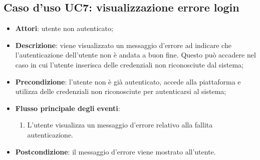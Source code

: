 \subsection{Caso d'uso UC7: visualizzazione errore login}
\begin{itemize}
\item \textbf{Attori}: utente non autenticato;
\item \textbf{Descrizione}: viene visualizzato un messaggio d'errore ad indicare che l'autenticazione dell'utente non è andata a buon fine. Questo può accadere nel caso in cui l'utente inserisca delle credenziali non riconosciute dal sistema; 
      \item \textbf{Precondizione}: l'utente non è già autenticato, accede alla piattaforma e utilizza delle credenziali non riconosciute per autenticarsi al sistema;

        \item \textbf{Flusso principale degli eventi}:
          \begin{enumerate}
          \item L'utente visualizza un messaggio d'errore relativo alla fallita autenticazione.

      \end{enumerate}
    \item \textbf{Postcondizione}: il messaggio d'errore viene mostrato all'utente.
  \end{itemize}
 

